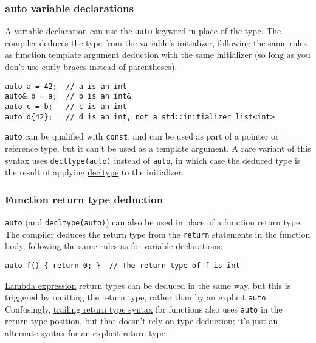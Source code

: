 \subsubsection{auto variable declarations}
A variable declaration can use the \texttt{auto} keyword in place of the type. The compiler deduces the type from the variable's initializer, following the same rules as function template argument deduction with the same initializer (so long as you don't use curly braces instead of parentheses).
\begin{verbatim}
auto a = 42;  // a is an int
auto& b = a;  // b is an int&
auto c = b;   // c is an int
auto d{42};   // d is an int, not a std::initializer_list<int>
\end{verbatim}
\texttt{auto} can be qualified with \texttt{const}, and can be used as part of a pointer or reference type, but it can't be used as a template argument. A rare variant of this syntax uses \texttt{decltype(auto)} instead of \texttt{auto}, in which case the deduced type is the result of applying \href{https://en.cppreference.com/w/cpp/language/decltype}{decltype} to the initializer.

\subsubsection{Function return type deduction}
\texttt{auto} (and \texttt{decltype(auto)}) can also be used in place of a function return type. The compiler deduces the return type from the \texttt{return} statements in the function body, following the same rules as for variable declarations:
\begin{verbatim}
auto f() { return 0; }  // The return type of f is int
\end{verbatim}
\hyperref[sec:lambda-expressions]{Lambda expression} return types can be deduced in the same way, but this is triggered by omitting the return type, rather than by an explicit \texttt{auto}. Confusingly, \hyperref[sec:trailing-return-type-syntax]{trailing return type syntax} for functions also uses \texttt{auto} in the return-type position, but that doesn't rely on type deduction; it's just an alternate syntax for an explicit return type.

